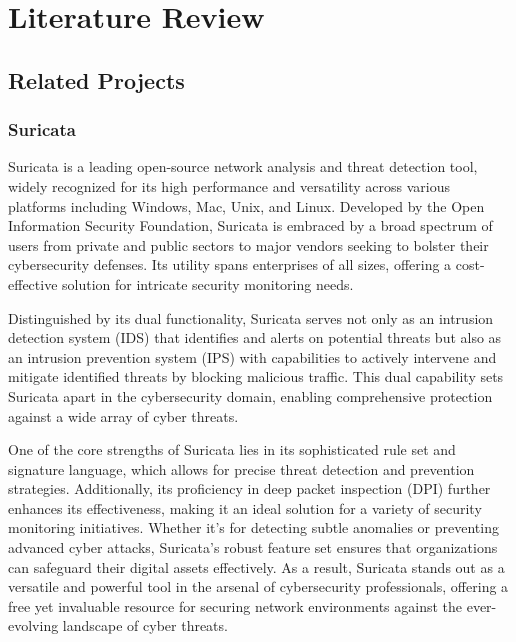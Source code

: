 \chapter{Literature Review}
\vspace{-18pt}
\section{Related Projects}
\vspace{-18pt}
\subsection{Suricata}
\vspace{-18pt}
Suricata is a leading open-source network analysis and threat detection tool, widely recognized for its high performance and versatility across various platforms including Windows, Mac, Unix, and Linux. Developed by the Open Information Security Foundation, Suricata is embraced by a broad spectrum of users from private and public sectors to major vendors seeking to bolster their cybersecurity defenses. Its utility spans enterprises of all sizes, offering a cost-effective solution for intricate security monitoring needs.\par 
Distinguished by its dual functionality, Suricata serves not only as an intrusion detection system (IDS) that identifies and alerts on potential threats but also as an intrusion prevention system (IPS) with capabilities to actively intervene and mitigate identified threats by blocking malicious traffic. This dual capability sets Suricata apart in the cybersecurity domain, enabling comprehensive protection against a wide array of cyber threats.\par 
One of the core strengths of Suricata lies in its sophisticated rule set and signature language, which allows for precise threat detection and prevention strategies. Additionally, its proficiency in deep packet inspection (DPI) further enhances its effectiveness, making it an ideal solution for a variety of security monitoring initiatives. Whether it's for detecting subtle anomalies or preventing advanced cyber attacks, Suricata's robust feature set ensures that organizations can safeguard their digital assets effectively. As a result, Suricata stands out as a versatile and powerful tool in the arsenal of cybersecurity professionals, offering a free yet invaluable resource for securing network environments against the ever-evolving landscape of cyber threats.
